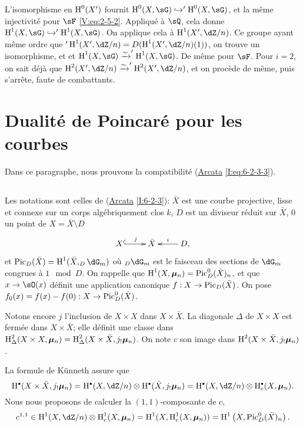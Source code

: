 L'isomorphisme en $\operatorname{H}^0(X')$ fournit $\h^0(X,\sG)\hookrightarrow '\h^0(X,\sG)$, 
et la même injectivité pour $\sF$ \eqref{V:eq:2-5-2}. Appliqué à $\sQ$, 
cela donne $\h^1(X,\sG)\hookrightarrow '\h^1(X,\sG)$. On applique cela à 
$\h^1(X',\dZ/n)$. Ce groupe ayant même ordre que 
$'\h^1(X',\dZ/n)=D(\h^1(X',\dZ/n)(1))$, on trouve un isomorphisme, et et 
$\h^1(X,\sG) \iso '\h^1(X,\sG)$. De même pour $\sF$. Pour $i=2$, on sait 
déjà que $\h^2(X',\dZ/n) \iso '\h^2(X',\dZ/n)$, et on procède de même, 
puis s'arrête, faute de combattants. 










\section{Dualité de Poincaré pour les courbes}\label{V:3}

Dans ce paragraphe, nous prouvons la compatibilité (\hyperref[I]{Arcata}  
\ref{I:eq:6-2-3-3}). 





\subsection{}\label{V:3-1}

Les notations sont celles de (\hyperref[I]{Arcata} \ref{I:6-2-3}): $\bar X$ est 
une courbe projective, lisse et connexe sur un corps algébriquement clos $k$, 
$D$ est un diviseur réduit sur $\bar X$, $0$ un point de 
$X=\bar X\setminus D$ 
\[\xymatrix{
  X \ar@{^{(}->}[r]^-j 
    & \bar X 
    & \ar[l]_-i D \text{,}
}\]
et $\pic_D(\bar X)=\h^1(\bar X,_D\dG_m)$ où $_D\dG_m$ est le faisceau des 
sections de $\dG_m$ congrues à $1\mod D$. On rappelle que 
$\operatorname{H}^1(X,{\bm\mu}_n) = \operatorname{Pic}_D^0(\bar X)_n$, et que $x\to \sO(x)$ définit une 
application canonique $f:X\to \operatorname{Pic}_D(\bar X)$. On pose 
$f_0(x)=f(x)-f(0):X\to \operatorname{Pic}_D^0(\bar X)$.

Notons encore $j$ l'inclusion de $X\times X$ dans $X\times \bar X$. La 
diagonale $\Delta$ de $X\times X$ est fermée dans $X\times \bar X$; elle 
définit une classe dans 
$\operatorname{H}_\Delta^2(X\times X,{\bm\mu}_n)=\operatorname{H}_\Delta^2(X\times \bar X,j_!{\bm\mu}_n)$. On note 
$c$ son image dans $\operatorname{H}^2(X\times \bar X,j_!{\bm\mu}_n)$. 

La formule de K\"unneth assure que 
\[
  \h^\bullet(X\times \bar X,j_!\dmu_n) = \h^\bullet(X,\dZ/n)\otimes \h^\bullet(\bar X,j_!\dmu_n) = \h^\bullet(X,\dZ/n)\otimes \h_c^\bullet(X,\dmu_n) \text{.}
\]
Nous nous proposons de calculer la $(1,1)$-composante de $c$, 
\[
  c^{1,1} \in \h^1(X,\dZ/n)\otimes \h_c^1(X,\dmu_n) = \h^1(X,\h_c^1(X,\dmu_n)) = \h^1\left(X,\pic_D^0(\bar X)_n\right) \text{.}
\]

